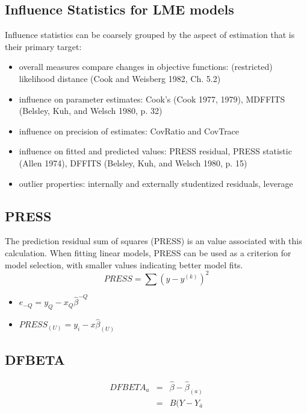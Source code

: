 \documentclass[12pt, a4paper]{report}
\begin{document}
\subsection{Influence Statistics for LME models} %
Influence statistics can be coarsely grouped by the aspect of estimation that is their primary target:
\begin{itemize}
	\item overall measures compare changes in objective functions: (restricted) likelihood distance (Cook and Weisberg 1982, Ch. 5.2)
	\item influence on parameter estimates: Cook's  (Cook 1977, 1979), MDFFITS (Belsley, Kuh, and Welsch 1980, p. 32)
	\item influence on precision of estimates: CovRatio and CovTrace
	\item influence on fitted and predicted values: PRESS residual, PRESS statistic (Allen 1974), DFFITS (Belsley, Kuh, and Welsch 1980, p. 15)
	\item outlier properties: internally and externally studentized residuals, leverage
\end{itemize}

\subsection{PRESS} %
The prediction residual sum of squares (PRESS) is an value associated with this calculation. When fitting linear models, PRESS can be used as a criterion for model selection, with smaller values indicating better model fits.
\begin{equation}
PRESS = \sum(y-y^{(k)})^2
\end{equation}


\begin{itemize}
	\item $e_{-Q} = y_{Q} - x_{Q}\hat{\beta}^{-Q}$
	\item $PRESS_{(U)} = y_{i} - x\hat{\beta}_{(U)}$
\end{itemize}

\subsection{DFBETA} %
\begin{eqnarray}
DFBETA_{a} &=& \hat{\beta} - \hat{\beta}_{(a)} \\
&=& B(Y-Y_{\bar{a}}
\end{eqnarray}
\end{document}
